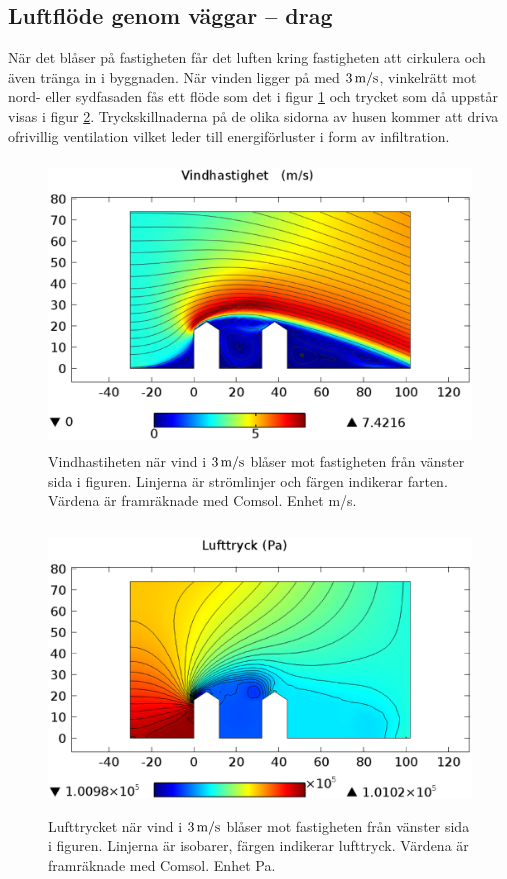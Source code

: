 \subsection{Luftflöde genom väggar – drag}
\label{sec:leakagewall}

När det blåser på fastigheten får det luften kring fastigheten att cirkulera och även tränga in i 
byggnaden. När vinden ligger på med $\unit[3]{m/s}$, vinkelrätt mot nord- eller sydfasaden fås 
ett flöde som det i figur \ref{fig:windspeed} och trycket som då uppstår visas i figur 
\ref{fig:windpressure}. Tryckskillnaderna på de olika sidorna av husen kommer att driva 
ofrivillig ventilation vilket leder till energiförluster i form av infiltration.

\begin{figure}[hpbt]
\centering
\includegraphics[width=127mm,height=76mm]{images/wind3mshdpi.eps}
\caption{\label{fig:windspeed}Vindhastiheten när vind i $\unit[3]{m/s}$ blåser mot fastigheten 
från vänster sida i figuren. Linjerna är strömlinjer och färgen indikerar farten. Värdena är 
framräknade med Comsol. Enhet m/s.}
\end{figure}


\begin{figure}[hpbt]
\centering
\includegraphics[width=127mm,height=76mm]{images/pressure3mshdpi.eps}

\caption{\label{fig:windpressure}Lufttrycket när vind i $\unit[3]{m/s}$ blåser mot fastigheten från vänster sida i figuren. Linjerna är isobarer, färgen indikerar lufttryck. Värdena är framräknade med Comsol. Enhet Pa.}
\end{figure}

